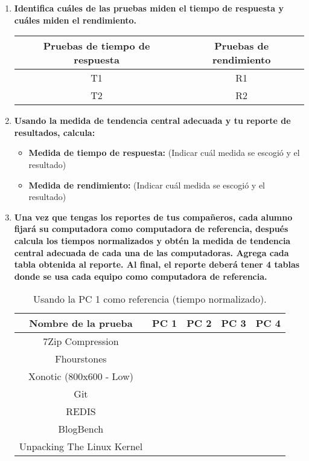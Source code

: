 \documentclass[12pt]{article}
\newcommand{\pl}[1]{\item \textbf{ #1 }}
\begin{document}
\begin{enumerate}[(3.1.1)]
    \pl{Identifica cuáles de las pruebas miden el tiempo de respuesta y cuáles miden el rendimiento.}
    \begin{table}[htb]
        \centering
        \begin{tabular}{|c|c|}
        \hline
        Pruebas de tiempo de respuesta & Pruebas de rendimiento \\
        \hline
        T1 & R1 \\
        \hline
        T2 & R2 \\
        \hline
        \end{tabular}
    \end{table}\par

    \pl{Usando la medida de tendencia central adecuada y tu reporte de resultados, calcula:}
    \begin{itemize}
        \pl{Medida de tiempo de respuesta:}(Indicar cuál medida se escogió y el resultado)\par
    
        \pl{Medida de rendimiento:} (Indicar cuál medida se escogió y el resultado)\par
    \end{itemize}

    \pl{Una vez que tengas los reportes de tus compañeros, cada alumno fijará su computadora como computadora de referencia, después calcula los tiempos normalizados y obtén la medida de tendencia central adecuada de cada una de las computadoras. Agrega cada tabla obtenida al reporte. Al final, el reporte deberá tener 4 tablas donde se usa cada equipo como computadora de referencia.}

    \begin{table}[htb]
        \centering
        \begin{tabular}{|c|c|c|c|c|}
        \hline
        \textbf{Nombre de la prueba} & \textbf{PC 1} & \textbf{PC 2} & \textbf{PC 3} & \textbf{PC 4}\\
        \hline
        7Zip Compression & & & & \\
        \hline
        Fhourstones & & & & \\
        \hline
        Xonotic (800x600 - Low) & & & &  \\
        \hline
        Git & & & &  \\
        \hline
        REDIS & & & &  \\
        \hline
        BlogBench & & & &  \\
        \hline
        Unpacking The Linux Kernel & & & & \\
        \hline
        \end{tabular}
        \caption{Usando la PC 1 como referencia (tiempo normalizado).}
    \end{table}


\end{enumerate}
\end{document}
